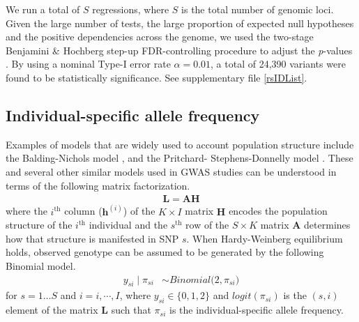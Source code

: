 \documentclass[custompaper]{MBE}%
\begin{document}
We run a total of $S$ regressions, where $S$ is the total number of genomic loci. Given the large number of tests, the large proportion of expected null hypotheses and the positive dependencies across the genome, we used the two-stage Benjamini \& Hochberg step-up FDR-controlling procedure to adjust the \textit{p}-values \citep{Benjamini2006}.
By using a nominal Type-I error rate $\alpha = 0.01$, a total of 24,390 variants were found to be statistically significance. 
See supplementary file  \ref{rsIDList}.

\subsection{Individual-specific allele frequency}
Examples of models that are widely used to account population structure include the Balding-Nichols model \citep{balding1995method}, and the Pritchard- Stephens-Donnelly model \citep{pritchard2000inference}. 
These and several other similar models used in GWAS studies can be understood in terms of the following matrix factorization. 
\begin{align}
\mathbf{L }= \mathbf{AH}
\end{align} 
where the $i^\text{th}$ column ($\boldsymbol{h}^{(i)}$) of the $K \times I$ matrix $\mathbf{H}$ encodes the population structure of the $i^\text{th}$ individual and the $s^\text{th}$ row of the $S \times K$ matrix $\mathbf{A}$ determines how that structure is manifested in SNP $s$. 
When Hardy-Weinberg equilibrium holds, observed genotype can be assumed to be generated by the following Binomial model.
\begin{align} \label{lfa}
y_{si} \mid \pi_{si}  &\sim Binomial\big( 2, \pi_{si} \big) 
\end{align} 
for $s=1\hdots S$ and $i=i,\cdots, I$, where $y_{si} \in \{0,1,2\}$ and $logit(\pi_{si})$ is the $(s,i)$ element of the matrix $\mathbf{L}$ such that  $\pi_{si}$ is the individual-specific allele frequency.
\end{document}
